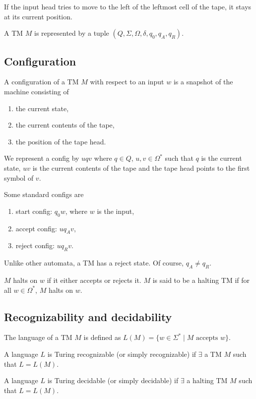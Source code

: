 \documentclass{article}
\begin{document}
If the input head tries to move to the left of the leftmost cell of the tape, it stays at its current position.

A TM $M$ is represented by a tuple $(Q, \Sigma, \Omega, \delta, q_0, q_A, q_R)$.

\subsection{Configuration}

A configuration of a TM $M$ with respect to an input $w$ is a snapshot of the machine consisting of 
\begin{enumerate}
\item\label{item:47} the current state, 
\item\label{item:48} the current contents of the tape, 
\item\label{item:49} the position of the tape head.
\end{enumerate}

We represent a config by $uqv$ where $q \in Q$, $u, v \in \Omega^{*}$ such that $q$ is the current state, $uv$ is the current contents of the tape and the tape head points to the first symbol of $v$.

Some standard configs are 
\begin{enumerate}
\item\label{item:50} start config: $q_0w$, where $w$ is the input,
\item\label{item:51} accept config: $uq_Av$, 
\item\label{item:52} reject config: $uq_Rv$.
\end{enumerate}

Unlike other automata, a TM has a reject state. Of course, $q_A \ne q_R$. 

$M$ halts on $w$ if it either accepts or rejects it. $M$ is said to be a halting TM if for all $w \in \Omega^{*}$, $M$ halts on $w$.

\subsection{Recognizability and decidability}

The language of a TM $M$ is defined as $L(M) = \{w \in \Sigma^{*} \mid M \text{ accepts } w \}$.

A language $L$ is Turing recognizable (or simply recognizable) if $\exists$ a TM $M$ such that $L = L(M)$.

A language $L$ is Turing decidable (or simply decidable) if $\exists$ a halting TM $M$ such that $L = L(M)$.
\end{document}
